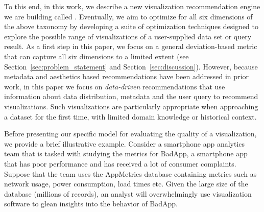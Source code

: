 To this end, in this work, we describe a new visualization recommendation engine we are building called {\it \SeeDB}.
Eventually, we aim to optimize for all six dimensions of the above taxonomy by developing a suite of optimization techniques designed to explore
the possible range of visualizations of a user-supplied data set or query result.  
As a first step in this paper, we focus on a general deviation-based metric that can capture all six dimensions to a limited extent (see Section~\ref{sec:problem_statement} and Section~\ref{sec:discussion}).  However, because metadata and aesthetics based recommendations have been addressed in prior work, in this paper we focus on {\it data-driven} recommendations that use information about data distribution, metadata and the user query to recommend visualizations.
Such visualizations are particularly appropriate when
approaching a dataset for the first time, with limited domain knowledge or historical context.


Before presenting our specific model for evaluating the quality of a visualization, we provide a brief illustrative example.
Consider a smartphone app analytics team that is tasked with studying the metrics for BadApp, a smartphone app that has
poor performance and has received a lot of consumer complaints. 
Suppose that the team uses the AppMetrics database containing metrics such as network usage, 
power consumption, load times etc.
Given the large size of the database (millions of records), an analyst will 
overwhelmingly use visualization software to glean insights into the behavior of BadApp.

